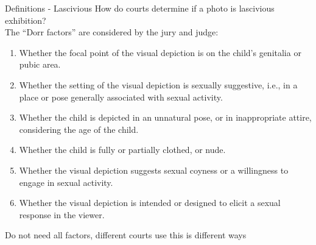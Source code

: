 \documentclass[nobackground,dvipsnames,table,aspectratio=169]{beamer}
\begin{document}
\begin{frame}{Definitions - Lascivious}
    \small
    How do courts determine if a photo is lascivious exhibition?\\
    The “Dorr factors” are considered by the jury and judge:\\
    \begin{enumerate}
        \item Whether the focal point of the visual depiction is on the child's genitalia or pubic area.
        \item Whether the setting of the visual depiction is sexually suggestive, i.e., in a place or pose generally associated with sexual activity.
        \item Whether the child is depicted in an unnatural pose, or in inappropriate attire, considering the age of the child.
        \item Whether the child is fully or partially clothed, or nude.
        \item Whether the visual depiction suggests sexual coyness or a willingness to engage in sexual activity.
        \item Whether the visual depiction is intended or designed to elicit a sexual response in the viewer.
    \end{enumerate}
    \vspace{0.02\textheight}
    Do not need all factors, different courts use this is different ways
\end{frame}
\end{document}
